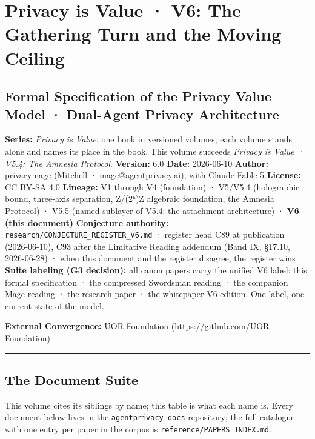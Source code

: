 \documentclass[
]{article}
\author{}
\date{}
\begin{document}
\section{Privacy is Value · V6: The Gathering Turn and the Moving
Ceiling}\label{privacy-is-value-v6-the-gathering-turn-and-the-moving-ceiling}

\subsection{Formal Specification of the Privacy Value Model · Dual-Agent
Privacy
Architecture}\label{formal-specification-of-the-privacy-value-model-dual-agent-privacy-architecture}

\textbf{Series:} \emph{Privacy is Value}, one book in versioned volumes;
each volume stands alone and names its place in the book. This volume
succeeds \emph{Privacy is Value · V5.4: The Amnesia Protocol}.
\textbf{Version:} 6.0 \textbf{Date:} 2026-06-10 \textbf{Author:}
privacymage (Mitchell · mage@agentprivacy.ai), with Claude Fable 5
\textbf{License:} CC BY-SA 4.0 \textbf{Lineage:} V1 through V4
(foundation) · V5/V5.4 (holographic bound, three-axis separation,
Z/(2⁶)Z algebraic foundation, the Amnesia Protocol) · V5.5 (named
sublayer of V5.4: the attachment architecture) · \textbf{V6 (this
document)} \textbf{Conjecture authority:}
\texttt{research/CONJECTURE\_REGISTER\_V6.md} · register head C89 at
publication (2026-06-10), C93 after the Limitative Reading addendum
(Band IX, §17.10, 2026-06-28) · when this document and the register
disagree, the register wins \textbf{Suite labeling (G3 decision):} all
canon papers carry the unified V6 label: this formal specification · the
compressed Swordsman reading · the companion Mage reading · the research
paper · the whitepaper V6 edition. One label, one current state of the
model.

\textbf{External Convergence:} UOR Foundation
(https://github.com/UOR-Foundation)

\begin{center}\rule{0.5\linewidth}{0.5pt}\end{center}

\subsection{The Document Suite}\label{the-document-suite}

This volume cites its siblings by name; this table is what each name is.
Every document below lives in the \texttt{agentprivacy-docs} repository;
the full catalogue with one entry per paper in the corpus is
\texttt{reference/PAPERS\_INDEX.md}.
\end{document}

